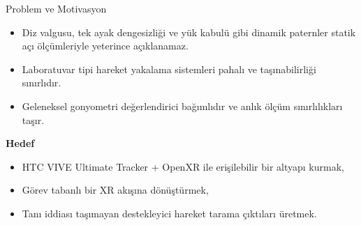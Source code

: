 \documentclass[aspectratio=169,12pt]{beamer}
\begin{document}
\begin{frame}{Problem ve Motivasyon}
  \begin{itemize}\setlength\itemsep{0.35em}
    \item Diz valgusu, tek ayak dengesizli\u{g}i ve y\"{u}k kabul\"{u} gibi dinamik paternler
          statik a\c{c}\i{} \"{o}l\c{c}\"{u}mleriyle yeterince a\c{c}\i{}klanamaz.
    \item Laboratuvar tipi hareket yakalama sistemleri pahal\i{} ve
          ta\c{s}\i{}nabilirli\u{g}i s\i{}n\i{}rl\i{}d\i{}r.
    \item Geleneksel gonyometri de\u{g}erlendirici ba\u{g}\i{}ml\i{}d\i{}r ve
          anl\i{}k \"{o}l\c{c}\"{u}m s\i{}n\i{}rl\i{}l\i{}klar\i{} ta\c{s}\i{}r.
  \end{itemize}

  \vspace{0.6em}
  \textcolor{pvred}{\textbf{Hedef}}
  \begin{itemize}\setlength\itemsep{0.3em}
    \item HTC VIVE Ultimate Tracker + OpenXR ile eri\c{s}ilebilir bir altyap\i{} kurmak,
    \item G\"{o}rev tabanl\i{} bir XR ak\i{}\c{s}\i{}na d\"{o}n\"{u}\c{s}t\"{u}rmek,
    \item Tan\i{} iddias\i{} ta\c{s}\i{}mayan destekleyici hareket tarama
          \c{c}\i{}kt\i{}lar\i{} \"{u}retmek.
  \end{itemize}
\end{frame}
\end{document}
